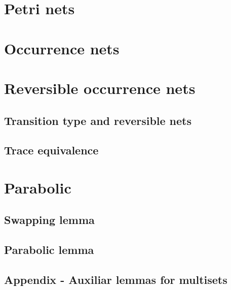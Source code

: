 %



\chapter{Petri nets}


\chapter{Occurrence nets}


\chapter{Reversible occurrence nets}

\section{Transition type and reversible nets}


\section{Trace equivalence}


\chapter{Parabolic}

\section{Swapping lemma}


\section{Parabolic lemma}


\section*{Appendix - Auxiliar lemmas for multisets}

